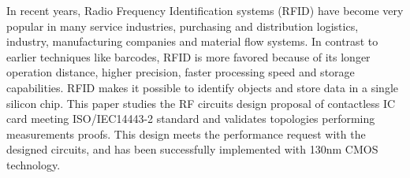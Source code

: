 In recent years, Radio Frequency Identification systems (RFID) \cite{rfid_handbook} have become very popular in many service industries, purchasing and distribution logistics, industry, manufacturing companies and material flow systems. In contrast to earlier techniques like barcodes, RFID is more favored because of its longer operation distance, higher precision, faster processing speed and storage capabilities. RFID makes it possible to identify objects and store data in a single silicon chip. This paper studies the RF circuits design proposal of contactless IC card meeting ISO/IEC14443-2 \cite{nfc_spec} standard and validates topologies performing measurements proofs. This design meets the performance request with the designed circuits, and has been successfully implemented with 130nm CMOS technology.